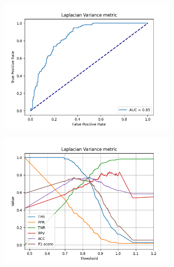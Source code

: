 \begin{figure}[H]
    \centering
    \begin{subfigure}[t]{0.48\textwidth}
        \includegraphics[width=\textwidth]{Figures/BlurredImages/results_on_thresholds/output_roc_lv.png}
        \caption{}
        \label{fig:LV_roc}
    \end{subfigure}\hspace{1em}
    \begin{subfigure}[t]{0.48\textwidth}
        \includegraphics[width=\textwidth]{Figures/BlurredImages/results_on_thresholds/threshold_test_scores_lv.png}
        \caption{}
        \label{fig:LV_thresh}
    \end{subfigure}\hspace{1em}

\end{figure}
